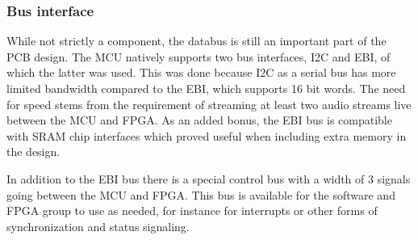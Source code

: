 \subsubsection{Bus interface}

While not strictly a component, the databus is still an important part of
the PCB design. The MCU natively supports two bus interfaces, I2C and EBI,
of which the latter was used. This was done because I2C as a
serial bus has more limited bandwidth compared to the EBI, which
supports 16 bit words. The need for speed stems from the requirement of
streaming at least two audio streams live between the MCU and FPGA.
As an added bonus, the EBI bus is compatible with SRAM chip interfaces
which proved useful when including extra memory in the design.

In addition to the EBI bus there is a special control bus with a width
of 3 signals going between the MCU and FPGA. This bus is available for the
software and FPGA group to use as needed, for instance for interrupts or
other forms of synchronization and status signaling.